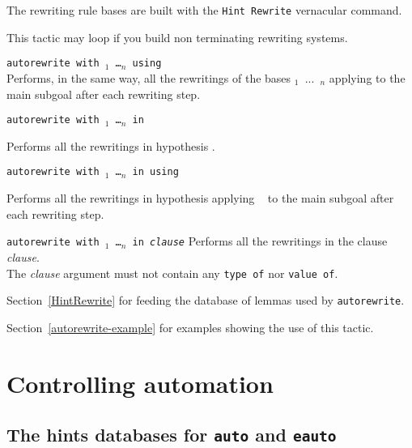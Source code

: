 The rewriting rule bases are built with the {\tt Hint~Rewrite} vernacular
command.

\Warning{} This tactic may loop if you build non terminating rewriting systems.

\begin{Variant}
\item {\tt autorewrite with \ident$_1$ \dots \ident$_n$ using \tac}\\
Performs, in the same way, all the rewritings of the bases {\tt \ident$_1$ $...$
\ident$_n$} applying {\tt \tac} to the main subgoal after each rewriting step.

\item \texttt{autorewrite with {\ident$_1$} \dots \ident$_n$ in {\qualid}}

  Performs all the rewritings in hypothesis {\qualid}.
\item \texttt{autorewrite with {\ident$_1$} \dots \ident$_n$ in {\qualid} using \tac}

  Performs all  the rewritings  in hypothesis {\qualid}  applying {\tt
    \tac} to the main subgoal after each rewriting step.

\item \texttt{autorewrite with {\ident$_1$} \dots \ident$_n$ in \textit{clause}}
  Performs all  the rewritings  in the clause \textit{clause}. \\
  The  \textit{clause} argument must  not contain  any \texttt{type  of} nor  \texttt{value  of}.

\end{Variant}

\SeeAlso Section~\ref{HintRewrite} for feeding the database of lemmas used by {\tt autorewrite}.

\SeeAlso Section~\ref{autorewrite-example} for examples showing the use of
this tactic. 


\section{Controlling automation}

\subsection{The hints databases for {\tt auto} and {\tt eauto}
\label{Hints-databases}
}

